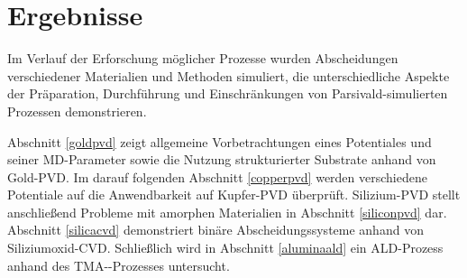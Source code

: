 \chapter{Ergebnisse}

Im Verlauf der Erforschung möglicher Prozesse wurden Abscheidungen verschiedener Materialien und Methoden simuliert, die unterschiedliche Aspekte der Präparation, Durchführung und Einschränkungen von Parsivald-simulierten Prozessen demonstrieren.

Abschnitt \ref{goldpvd} zeigt allgemeine Vorbetrachtungen eines Potentiales und seiner MD-Parameter sowie die Nutzung strukturierter Substrate anhand von Gold-PVD.
Im darauf folgenden Abschnitt \ref{copperpvd} werden verschiedene Potentiale auf die Anwendbarkeit auf Kupfer-PVD überprüft.
Silizium-PVD stellt anschließend Probleme mit amorphen Materialien in Abschnitt \ref{siliconpvd} dar.
Abschnitt \ref{silicacvd} demonstriert binäre Abscheidungssysteme anhand von Siliziumoxid-CVD.
Schließlich wird in Abschnitt \ref{aluminaald} ein ALD-Prozess anhand des TMA--Prozesses untersucht.


\clearpage

\clearpage

\clearpage

\clearpage

